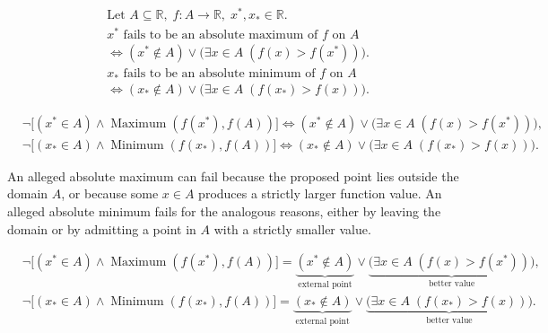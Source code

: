 \begin{remark*}
\[
\begin{aligned}
&\text{Let } A \subseteq \mathbb{R},\; f \colon A \to \mathbb{R},\; x^{*}, x_{*} \in \mathbb{R}.\\
&x^{*} \text{ fails to be an absolute maximum of } f \text{ on } A\\
&\Longleftrightarrow (x^{*} \notin A) \lor \bigl(\exists x \in A\; (f(x) > f(x^{*}))\bigr).\\
&x_{*} \text{ fails to be an absolute minimum of } f \text{ on } A\\
&\Longleftrightarrow (x_{*} \notin A) \lor \bigl(\exists x \in A\; (f(x_{*}) > f(x))\bigr).
\end{aligned}
\]
\end{remark*}

\begin{remark*}
\[
\begin{aligned}
&\neg\bigl[(x^{*} \in A) \land \operatorname{Maximum}(f(x^{*}), f(A))\bigr]
\Longleftrightarrow (x^{*} \notin A) \lor \bigl(\exists x \in A\; (f(x) > f(x^{*}))\bigr),\\
&\neg\bigl[(x_{*} \in A) \land \operatorname{Minimum}(f(x_{*}), f(A))\bigr]
\Longleftrightarrow (x_{*} \notin A) \lor \bigl(\exists x \in A\; (f(x_{*}) > f(x))\bigr).
\end{aligned}
\]
\end{remark*}

\begin{remark*}
An alleged absolute maximum can fail because the proposed point lies outside the domain $A$, or because some $x \in A$ produces a strictly larger function value. An alleged absolute minimum fails for the analogous reasons, either by leaving the domain or by admitting a point in $A$ with a strictly smaller value.
\end{remark*}

\begin{remark*}
\[
\begin{aligned}
&\neg\bigl[(x^{*} \in A) \land \operatorname{Maximum}(f(x^{*}), f(A))\bigr]
= \underbrace{(x^{*} \notin A)}_{\text{external point}}
\lor
\underbrace{\bigl(\exists x \in A\; (f(x) > f(x^{*}))\bigr)}_{\text{better value}},\\
&\neg\bigl[(x_{*} \in A) \land \operatorname{Minimum}(f(x_{*}), f(A))\bigr]
= \underbrace{(x_{*} \notin A)}_{\text{external point}}
\lor
\underbrace{\bigl(\exists x \in A\; (f(x_{*}) > f(x))\bigr)}_{\text{better value}}.
\end{aligned}
\]
\end{remark*}





